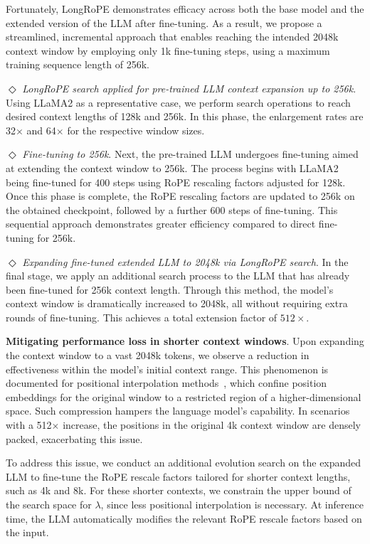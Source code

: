 Fortunately, LongRoPE demonstrates efficacy across both the base model and the extended version of the LLM after fine-tuning. As a result, we propose a streamlined, incremental approach that enables reaching the intended 2048k context window by employing only 1k fine-tuning steps, using a maximum training sequence length of 256k.

$\Diamond$ \textit{LongRoPE search applied for pre-trained LLM context expansion up to 256k}. Using LLaMA2 as a representative case, we perform search operations to reach desired context lengths of 128k and 256k. In this phase, the enlargement rates are 32$\times$ and 64$\times$ for the respective window sizes.

$\Diamond$ \textit{Fine-tuning to 256k}. Next, the pre-trained LLM undergoes fine-tuning aimed at extending the context window to 256k. The process begins with LLaMA2 being fine-tuned for 400 steps using RoPE rescaling factors adjusted for 128k. Once this phase is complete, the RoPE rescaling factors are updated to 256k on the obtained checkpoint, followed by a further 600 steps of fine-tuning. This sequential approach demonstrates greater efficiency compared to direct fine-tuning for 256k.

$\Diamond$ \textit{Expanding fine-tuned extended LLM to 2048k via LongRoPE search}. In the final stage, we apply an additional search process to the LLM that has already been fine-tuned for 256k context length. Through this method, the model's context window is dramatically increased to 2048k, all without requiring extra rounds of fine-tuning. This achieves a total extension factor of $512\times$.

\textbf{Mitigating performance loss in shorter context windows}.  Upon expanding the context window to a vast 2048k tokens, we observe a reduction in effectiveness within the model's initial context range. This phenomenon is documented for positional interpolation methods~\cite{pi}, which confine position embeddings for the original window to a restricted region of a higher-dimensional space. Such compression hampers the language model’s capability. In scenarios with a 512$\times$ increase, the positions in the original 4k context window are densely packed, exacerbating this issue.

To address this issue, we conduct an additional evolution search on the expanded LLM to fine-tune the RoPE rescale factors tailored for shorter context lengths, such as 4k and 8k. For these shorter contexts, we constrain the upper bound of the search space for $\lambda$, since less positional interpolation is necessary. At inference time, the LLM automatically modifies the relevant RoPE rescale factors based on the input.


